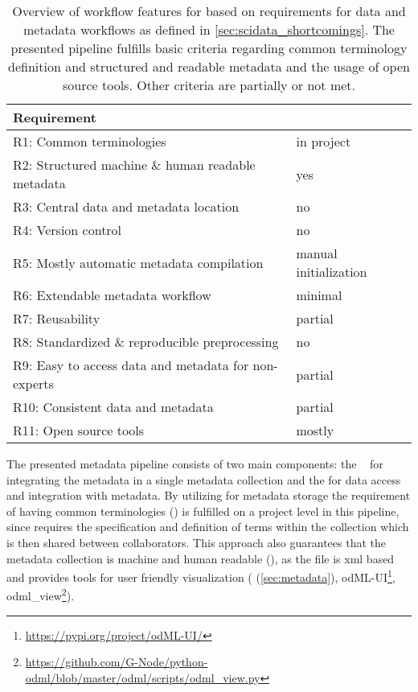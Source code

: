 \begin{table}[htb]
\begin{tabular}{ll}
\hline
Requirement                                          &  \cite{Brochier_2018} \\  \hline
R1: Common terminologies                             &  in project \\ 
R2: Structured machine \& human readable metadata    &  yes \\ 
R3: Central data and metadata location               &  no \\ 
R4: Version control                                  &  no \\ 
R5: Mostly automatic metadata compilation            &  manual initialization \\ 
R6: Extendable metadata workflow                     &  minimal \\ 
R7: Reusability                                      &  partial \\ 
R8: Standardized \& reproducible preprocessing       &  no \\ 
R9: Easy to access data and metadata for non-experts &  partial \\ 
R10: Consistent data and metadata                    &  partial \\ 
R11: Open source tools                               &  mostly \\ \hline
\end{tabular}
\caption[Overview of workflow features for \citet{Brochier_2018}]{Overview of workflow features for \citet{Brochier_2018} based on requirements for data and metadata workflows as defined in \cref{sec:scidata_shortcomings}. The presented pipeline fulfills basic criteria regarding common terminology definition and structured and readable metadata and the usage of open source tools. Other criteria are partially or not met.}
\label{tab:requirement_check_scidata}
\end{table}

The presented metadata pipeline consists of two main components: the \  for integrating the metadata in a single  metadata collection and the  for data access and integration with metadata. By utilizing  for metadata storage the requirement of having common terminologies () is fulfilled on a project level in this pipeline, since  requires the specification and definition of terms within the collection which is then shared between collaborators. This approach also guarantees that the metadata collection is machine and human readable (), as the  file is xml based and provides tools for user friendly visualization ( (\cref{sec:metadata}), odML-UI\footnote{\url{https://pypi.org/project/odML-UI/}}, odml\_view\footnote{\url{https://github.com/G-Node/python-odml/blob/master/odml/scripts/odml_view.py}}).

